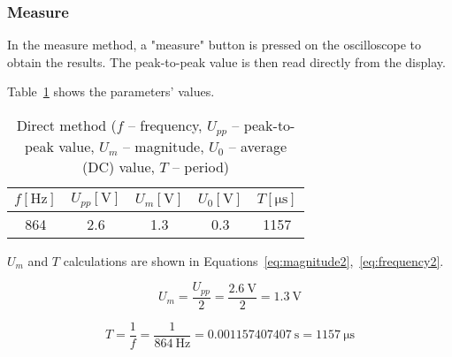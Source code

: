 \subsubsection*{Measure}

In the measure method, a "measure" button is pressed on the oscilloscope to obtain the results. The peak-to-peak value is then read directly from the display.

Table~\ref{tab:measure-method} shows the parameters' values.

\begin{table}[H]
	\centering
	\begin{tabular}{c|c|c|c|c}
		$f [\unit{\hertz}]$ & $U_{pp} [\unit{\volt}]$ & $U_{m} [\unit{\volt}]$ & $U_{0} [\unit{\volt}]$ & $T [\unit{\micro\second}]$\\
		\hline
		864 & 2.6 & 1.3 & 0.3 & 1157
	\end{tabular}
	\caption{Direct method ($f$ -- frequency, $U_{pp}$ -- peak-to-peak value, $U_{m}$ -- magnitude, $U_{0}$ -- average (DC) value, $T$ -- period)}
	\label{tab:measure-method}
\end{table}   

$U_{m}$ and $T$ calculations are shown in Equations~\ref{eq:magnitude2},~\ref{eq:frequency2}.

\begin{equation}
	U_{m} = \frac{U_{pp}}{2} = \frac{\SI{2.6}{\volt}}{2} = \SI{1.3}{\volt}
	\label{eq:magnitude2}
\end{equation}

\begin{equation}
	T = \frac{1}{f} = \frac{1}{\SI{864}{\hertz}} = \SI{0.001157407407}{\second} = \SI{1157}{\micro\second}
	\label{eq:frequency2}
\end{equation}

\subsection{}











